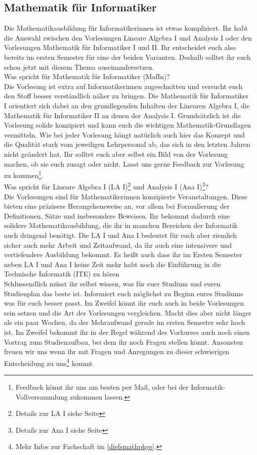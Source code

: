 \subsection{Mathematik für Informatiker}
\label{mafin}

Die Mathematikausbildung für Informatikerinnen ist etwas kompliziert. Ihr habt die Auswahl zwischen den Vorlesungen Lineare Algebra I und Analysis I oder den Vorlesungen Mathematik für Informatiker I und II. Ihr entscheidet euch also bereits im ersten Semester für eine der beiden Varianten. Deshalb solltet ihr euch schon jetzt mit diesem Thema auseinandersetzen.\\

Was spricht für Mathematik für Informatiker (MafIn)?\\
Die Vorlesung ist extra auf Informatikerinnen zugeschnitten und versucht euch den Stoff besser verständlich näher zu bringen. Die Mathematik für Informatiker I orientiert sich dabei an den grundlegenden Inhalten der Linearen Algebra I, die Mathematik für Informatiker II an denen der Analysis I. Grundsätzlich ist die Vorlesung solide konzipiert und kann euch die wichtigen Mathematik-Grundlagen vermitteln. Wie bei jeder Vorlesung hängt natürlich auch hier das Konzept und die Qualität stark vom jeweiligen Lehrpersonal ab, das sich in den letzten Jahren nicht geändert hat. Ihr solltet euch aber selbst ein Bild von der Vorlesung machen, ob sie euch zusagt oder nicht. Lasst uns gerne Feedback zur Vorlesung zu kommen\footnote{Feedback könnt ihr uns am besten per Mail, oder bei der Informatik-Vollversammlung zukommen lassen.}.\\

Was spricht für Lineare Algebra I (LA I)\footnote{Details zur LA I siehe Seite \pageref{la1}} und Analysis I (Ana I)\footnote{Details zur Ana I siehe Seite \pageref{ana1}}?\\
Die Vorlesungen sind für Mathematikerinnen konzipierte Veranstaltungen. Diese bieten eine präzisere Herangehensweise an, vor allem bei Formulierung der Definitionen, Sätze und insbesondere Beweisen. Ihr bekommt dadurch eine solidere Mathematikausbildung, die ihr in manchen Bereichen der Informatik auch dringend benötigt. Die LA I und Ana I bedeutet für euch aber ziemlich sicher auch mehr Arbeit und Zeitaufwand, da ihr auch eine intensivere und vertiefendere Ausbildung bekommt. Es heißt auch dass ihr im Ersten Semester neben LA I und Ana I keine Zeit mehr habt noch die Einführung in die Technische Informatik (ITE) zu hören\\

Schlussendlich müsst ihr selbst wissen, was für euer Studium und euren Studienplan das beste ist. Informiert euch möglichst zu Beginn eures Studiums was für euch besser passt. Im Zweifel könnt ihr euch auch in beide Vorlesungen rein setzen und die Art der Vorlesungen vergleichen. Macht dies aber nicht länger als ein paar Wochen, da der Mehraufwand gerade im ersten Semester sehr hoch ist. Im Zweifel bekommt ihr in der Regel während des Vorkurses auch noch einen Vortrag zum Studienaufbau, bei dem ihr noch Fragen stellen könnt. Ansonsten freuen wir uns wenn ihr mit Fragen und Anregungen zu dieser schwierigen Entscheidung zu uns\footnote{Mehr Infos zur Fachschaft im \autoref{diefsmathphys}.} kommt
